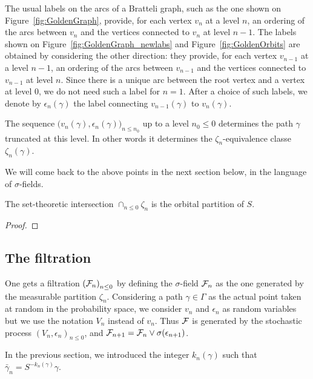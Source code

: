\documentclass[12pt,a4paper]{article}
\begin{document}
The usual labels on the arcs of a Bratteli graph, such as the one 
shown on Figure~\ref{fig:GoldenGraph}, provide, for each vertex $v_n$ 
at a level $n$, an ordering of the arcs between $v_n$ and the vertices connected 
to $v_n$ at level $n-1$.  
The labels shown on Figure~\ref{fig:GoldenGraph_newlabs} and Figure~\ref{fig:GoldenOrbits} 
are obtained by considering the other direction: they provide, 
for each vertex $v_{n-1}$ at a level $n-1$, 
an ordering of the arcs between $v_{n-1}$ and the vertices connected 
to $v_{n-1}$ at level $n$. 
Since there is a unique arc between the root vertex and a vertex at level $0$, 
we do not need such a label for $n=1$. 
After a choice of such labels, we denote 
by $\epsilon_n(\gamma)$ the label connecting $v_{n-1}(\gamma)$ to 
$v_n(\gamma)$. 
 
The sequence $\bigl(v_n(\gamma), \epsilon_n(\gamma)\bigr)_{n \leq n_0}$ up to 
a level $n_0 \leq 0$ determines the path $\gamma$ truncated at this level. 
In other words it determines the $\zeta_{n}$-equivalence classe 
$\zeta_n(\gamma)$. 

We will come back to the above points in the next section below, in the 
language of $\sigma$-fields. 

\begin{lemma}
The set-theoretic intersection $\cap_{n \leq 0} \zeta_n$ is the orbital partition of $S$. 
\end{lemma}

\begin{proof}

\end{proof}

\subsection{The filtration}

One gets a filtration ${(\mathcal{F}_n)}_{n \leq 0}$ by defining the $\sigma$-field 
$\mathcal{F}_n$ as the one generated by the measurable partition $\zeta_n$. 
Considering a path $\gamma \in \Gamma$ as the actual point taken at random 
in the probability space, we consider $v_n$ and $\epsilon_n$ as random 
variables but we use the notation $V_n$ instead of $v_n$. 
Thus $\mathcal{F}$ is generated by the stochastic process 
${(V_n, \epsilon_n)}_{n \leq 0}$, and 
$\mathcal{F}_{n+1} = \mathcal{F}_n \vee \sigma(\epsilon_{n+1})$.  

In the previous section, we introduced the integer $k_n(\gamma)$ such that 
$\bar\gamma_n = S^{-k_n(\gamma)}\gamma$. 
\end{document}
